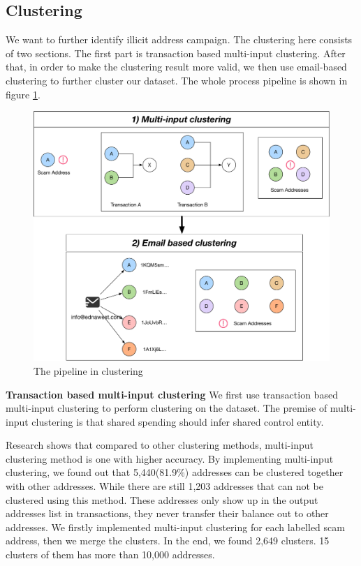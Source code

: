 \subsection{Clustering}

We want to further identify illicit address campaign. The clustering here consists of two sections. The first part is transaction based multi-input clustering. After that, in order to make the clustering result more valid, we then use email-based clustering to further cluster our dataset. The whole process pipeline is shown in figure \ref{fig:clustering-pipeline}.
\begin{figure}[tbp]
\centerline{\includegraphics[width=\columnwidth]{images/clustering.pdf}}
\caption{The pipeline in clustering}
\label{fig:clustering-pipeline}
\end{figure}

\textbf{Transaction based multi-input clustering}
We first use transaction based multi-input clustering to perform clustering on the dataset. The premise of multi-input clustering is that shared spending should infer shared control entity.


Research shows that compared to other clustering methods, multi-input clustering method is one with higher accuracy\cite{androulaki2013evaluating,harrigan2016unreasonable}.  By implementing multi-input clustering, we found out that 5,440(81.9\%)  addresses can be clustered together with other addresses. While there are still 1,203 addresses that can not be clustered using this method. These addresses only show up in the output addresses list in transactions, they never transfer their balance out to other addresses. We firstly implemented multi-input clustering for each labelled scam address, then we merge the clusters. In the end, we found 2,649 clusters. 15 clusters of them has more than 10,000 addresses.




